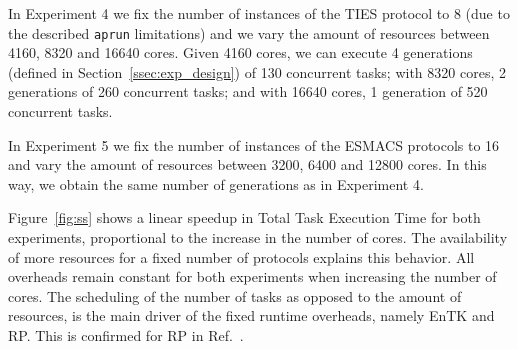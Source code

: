 
In Experiment 4 we fix the number of instances of the TIES protocol to 8 (due
to the described \texttt{aprun} limitations) and we vary the amount of
resources between 4160, 8320 and 16640 cores. Given 4160 cores, we can
execute 4 generations (defined in Section~\ref{ssec:exp_design}) of 130
concurrent tasks; with 8320 cores, 2 generations of 260 concurrent tasks; and
with 16640 cores, 1 generation of 520 concurrent tasks.

In Experiment 5 we fix the number of instances of the ESMACS protocols to 16
and vary the amount of resources between 3200, 6400 and 12800 cores. In this
way, we obtain the same number of generations as in Experiment 4.

Figure~\ref{fig:ss} shows a linear speedup in Total Task Execution Time for
both experiments, proportional to the increase in the number of cores. The
availability of more resources for a fixed number of protocols explains this
behavior. All overheads remain constant for both experiments when increasing
the number of cores. The scheduling of the number of tasks as opposed to the
amount of resources, is the main driver of the fixed runtime overheads,
namely EnTK and RP. This is confirmed for RP in Ref.~\cite{merzky2018}.

